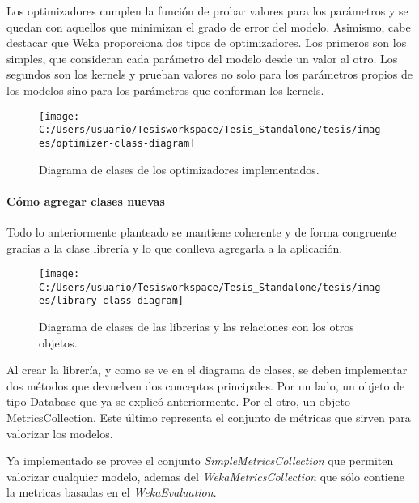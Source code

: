 Los optimizadores cumplen la función de probar valores para los parámetros
y se quedan con aquellos que minimizan el grado de error del modelo.
Asimismo, cabe destacar que Weka proporciona dos tipos de optimizadores.
Los primeros son los simples, que consideran cada parámetro del modelo
desde un valor al otro. Los segundos son los kernels y prueban valores
no solo para los parámetros propios de los modelos sino para los parámetros
que conforman los kernels. 

\begin{figure}
\begin{centering}
\texttt{[image: C:/Users/usuario/Tesisworkspace/Tesis\_Standalone/tesis/images/optimizer-class-diagram]}
\par\end{centering}

\caption{Diagrama de clases de los optimizadores implementados.\label{fig:optimizer-class-diagram}}
\end{figure}



\paragraph*{Cómo agregar clases nuevas}

Todo lo anteriormente planteado se mantiene coherente y de forma congruente
gracias a la clase librería y lo que conlleva agregarla a la aplicación. 

\begin{figure}
\begin{centering}
\texttt{[image: C:/Users/usuario/Tesisworkspace/Tesis\_Standalone/tesis/images/library-class-diagram]}
\par\end{centering}

\caption{Diagrama de clases de las librerias y las relaciones con los otros
objetos.\label{fig:library-class-diagram}}
\end{figure}


Al crear la librería, y como se ve en el diagrama de clases, se deben
implementar dos métodos que devuelven dos conceptos principales. Por
un lado, un objeto de tipo Database que ya se explicó anteriormente.
Por el otro, un objeto MetricsCollection. Este último representa el
conjunto de métricas que sirven para valorizar los modelos. 

Ya implementado se provee el conjunto \emph{SimpleMetricsCollection}
que permiten valorizar cualquier modelo, ademas del \emph{WekaMetricsCollection}
que sólo contiene la metricas basadas en el \emph{WekaEvaluation}. 

